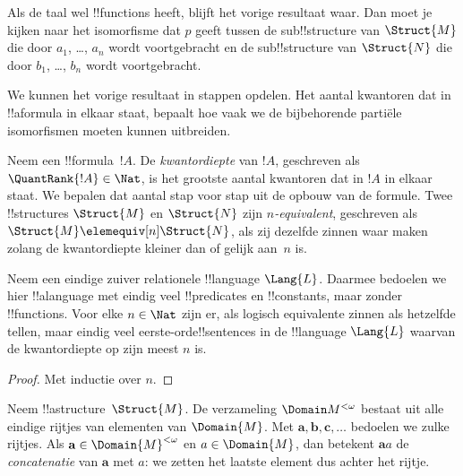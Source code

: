 \documentclass[openany]{memoir}
\begin{document}
\begin{rem}
Als de taal wel !!{function}s heeft, blijft het vorige resultaat waar.
Dan moet je kijken naar het isomorfisme dat $p$ geeft tussen de
sub!!{structure} van $\Struct{M}$ die door $a_1$, \dots, $a_n$ wordt
voortgebracht en de sub!!{structure} van $\Struct{N}$ die door
$b_1$, \dots, $b_n$ wordt voortgebracht.
\end{rem}

We kunnen het vorige resultaat in stappen opdelen. Het aantal kwantoren
dat in !!a{formula} in elkaar staat, bepaalt hoe vaak we de bijbehorende
partiële isomorfismen moeten kunnen uitbreiden.

\begin{defn}
  Neem een !!{formula}~$!A$. De \emph{kwantordiepte} van $!A$,
  geschreven als $\QuantRank{!A} \in \Nat$, is het grootste aantal
  kwantoren dat in $!A$ in elkaar staat. We bepalen dat aantal stap
  voor stap uit de opbouw van de formule. Twee !!{structure}s
  $\Struct{M}$ en $\Struct{N}$ zijn \emph{$n$-equivalent}, geschreven
  als $\Struct{M} \elemequiv[n] \Struct{N}$, als zij dezelfde zinnen
  waar maken zolang de kwantordiepte kleiner dan of gelijk aan~$n$ is.
\end{defn}

\begin{prop}
  Neem een eindige zuiver relationele !!{language} $\Lang{L}$. Daarmee
  bedoelen we hier !!a{language} met eindig veel !!{predicate}s en
  !!{constant}s, maar zonder !!{function}s. Voor elke $n \in \Nat$
  zijn er, als logisch equivalente zinnen als hetzelfde tellen, maar
  eindig veel eerste-orde!!{sentence}s in de !!{language} $\Lang{L}$
  waarvan de kwantordiepte op zijn meest $n$ is.
\end{prop}

\begin{proof}
  Met inductie over $n$.
\end{proof}

\begin{defn}
  Neem !!a{structure}~$\Struct{M}$. De verzameling
  $\Domain M^{<\omega}$ bestaat uit alle eindige rijtjes van elementen
  van $\Domain{M}$. Met $\mathbf{a}, \mathbf{b}, \mathbf{c}, \ldots$
  bedoelen we zulke rijtjes. Als
  $\mathbf{a} \in \Domain{M}^{<\omega}$ en $a \in \Domain{M}$, dan
  betekent $\mathbf{a}a$ de \emph{concatenatie} van $\mathbf{a}$ met
  $a$: we zetten het laatste element dus achter het rijtje.
\end{defn}
\end{document}
